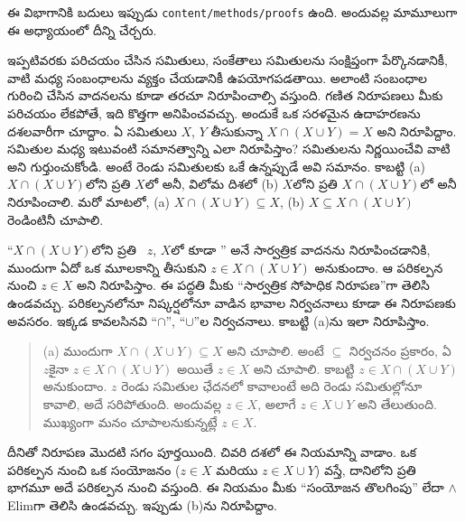 \documentclass[../../../include/open-logic-section]{subfiles}
\begin{document}

\begin{editorial}
ఈ విభాగానికి బదులు ఇప్పుడు \verb|content/methods/proofs| ఉంది. అందువల్ల మామూలుగా ఈ అధ్యాయంలో దీన్ని చేర్చరు.
\end{editorial}

\begin{explain}
ఇప్పటివరకు పరిచయం చేసిన సమితులు, సంకేతాలు సమితులను సంక్షిప్తంగా పేర్కొనడానికీ, వాటి మధ్య సంబంధాలను వ్యక్తం చేయడానికీ ఉపయోగపడతాయి. అలాంటి సంబంధాల గురించి చేసిన వాదనలను కూడా తరచూ నిరూపించాల్సి వస్తుంది. గణిత నిరూపణలు మీకు పరిచయం లేకపోతే, ఇది కొత్తగా అనిపించవచ్చు. అందుకే ఒక సరళమైన ఉదాహరణను దశలవారీగా చూద్దాం. ఏ సమితులు $X$, $Y$ తీసుకున్నా $X \cap (X \cup Y) = X$ అని నిరూపిద్దాం. సమితుల మధ్య ఇటువంటి సమానత్వాన్ని ఎలా నిరూపిస్తాం? సమితులను నిర్ణయించేవి వాటి  అని గుర్తుంచుకోండి. అంటే రెండు సమితులకు ఒకే  ఉన్నప్పుడే అవి సమానం. కాబట్టి (a) $X \cap (X \cup Y)$లోని ప్రతి  $X$లో  అనీ, విలోమ దిశలో (b) $X$లోని ప్రతి  $X \cap (X \cup Y)$లో  అనీ నిరూపించాలి. మరో మాటలో, (a) $X \cap (X \cup Y) \subseteq X$, (b) $X \subseteq X \cap (X \cup Y)$ రెండింటినీ చూపాలి.

“$X \cap (X \cup Y)$లోని ప్రతి ~$z$, $X$లో కూడా ” అనే సార్వత్రిక వాదనను నిరూపించడానికి, ముందుగా ఏదో ఒక మూలకాన్ని తీసుకుని $z \in X \cap (X \cup Y)$ అనుకుందాం. ఆ పరికల్పన నుంచి $z \in X$ అని నిరూపిస్తాం. ఈ పద్ధతి మీకు “సార్వత్రిక సోపాధిక నిరూపణ”గా తెలిసి ఉండవచ్చు. పరికల్పనలోనూ నిష్కర్షలోనూ వాడిన భావాల నిర్వచనాలు కూడా ఈ నిరూపణకు అవసరం. ఇక్కడ కావలసినవి “$\cap$”, “$\cup$”ల నిర్వచనాలు. కాబట్టి (a)ను ఇలా నిరూపిస్తాం.

\begin{quote}
(a) ముందుగా $X \cap (X \cup Y) \subseteq X$ అని చూపాలి. అంటే $\subseteq$ నిర్వచనం ప్రకారం, ఏ~$z$కైనా $z \in X \cap (X \cup Y)$ అయితే $z \in X$ అని చూపాలి. కాబట్టి $z \in X \cap (X \cup Y)$ అనుకుందాం. $z$ రెండు సమితుల ఛేదనలో  కావాలంటే అది రెండు సమితుల్లోనూ  కావాలి, అదే సరిపోతుంది. అందువల్ల $z \in X$, అలాగే $z \in X \cup Y$ అని తేలుతుంది. ముఖ్యంగా మనం చూపాలనుకున్నట్లే $z \in X$.
\end{quote}

దీనితో నిరూపణ మొదటి సగం పూర్తయింది. చివరి దశలో ఈ నియమాన్ని వాడాం. ఒక పరికల్పన నుంచి ఒక సంయోజనం ($z \in X$ మరియు $z \in X \cup Y$) వస్తే, దానిలోని ప్రతి భాగమూ అదే పరికల్పన నుంచి వస్తుంది. ఈ నియమం మీకు “సంయోజన తొలగింపు” లేదా $\land$Elimగా తెలిసి ఉండవచ్చు. ఇప్పుడు (b)ను నిరూపిద్దాం.


\end{explain}
\end{document}
